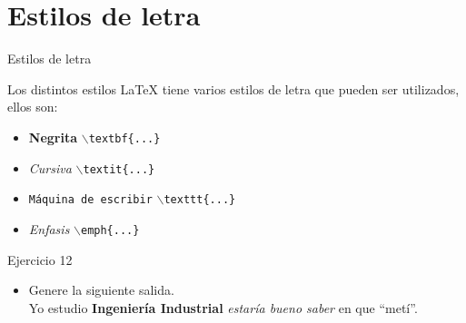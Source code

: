     \section{Estilos de letra}

    \begin{frame}{Estilos de letra}
        \begin{block}{Los distintos estilos}
            \LaTeX{} tiene varios estilos de letra que pueden ser utilizados, ellos son: \\
            \begin{itemize}
                \item \textbf{Negrita} \texttt{$\backslash$textbf\{...\}}
                \item \textit{Cursiva} \texttt{$\backslash$textit\{...\}}
                \item \texttt{M\'aquina de escribir} \texttt{$\backslash$texttt\{...\}}
                \item \emph{Enfasis} \texttt{$\backslash$emph\{...\}}
            \end{itemize}
        \end{block}

        \begin{exampleblock}{Ejercicio 12}
            \begin{itemize}
                \item Genere la siguiente salida. \\
                    Yo estudio \textbf{Ingenier\'ia Industrial} \textit{estar\'ia bueno saber} en que ``met\'i''. \\
            \end{itemize}
        \end{exampleblock}
    \end{frame}
